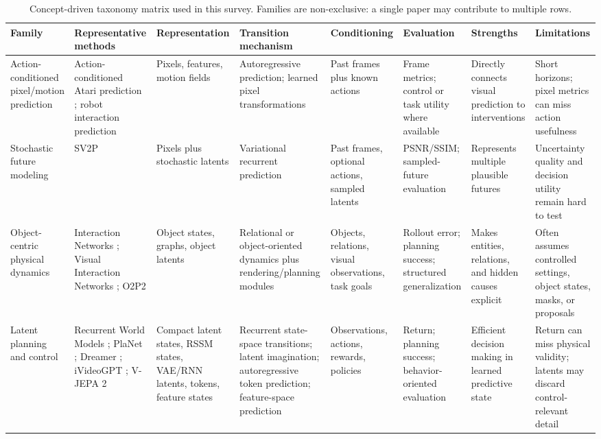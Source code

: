 \begin{table}[t]
\centering
\scriptsize
\setlength{\tabcolsep}{2pt}
\renewcommand{\arraystretch}{1.15}
\caption{Concept-driven taxonomy matrix used in this survey. Families are non-exclusive: a single paper may contribute to multiple rows.}
\label{tab:taxonomy_branches}
\begin{tabular}{p{} p{} p{} p{} p{} p{} p{} p{}}
\toprule
Family & Representative methods & Representation & Transition mechanism & Conditioning & Evaluation & Strengths & Limitations \\
\midrule
Action-conditioned pixel/motion prediction & Action-conditioned Atari prediction \cite{oh2015_action_conditional_video_prediction_prov}; robot interaction prediction \cite{finn2016_physical_interaction_video_prediction_prov} & Pixels, features, motion fields & Autoregressive prediction; learned pixel transformations & Past frames plus known actions & Frame metrics; control or task utility where available & Directly connects visual prediction to interventions & Short horizons; pixel metrics can miss action usefulness \\
Stochastic future modeling & SV2P \cite{babaeizadeh2018_sv2p_prov} & Pixels plus stochastic latents & Variational recurrent prediction & Past frames, optional actions, sampled latents & PSNR/SSIM; sampled-future evaluation & Represents multiple plausible futures & Uncertainty quality and decision utility remain hard to test \\
Object-centric physical dynamics & Interaction Networks \cite{battaglia2016_interaction_networks_prov}; Visual Interaction Networks \cite{watters2017_visual_interaction_networks_prov}; O2P2 \cite{janner2019_o2p2_prov} & Object states, graphs, object latents & Relational or object-oriented dynamics plus rendering/planning modules & Objects, relations, visual observations, task goals & Rollout error; planning success; structured generalization & Makes entities, relations, and hidden causes explicit & Often assumes controlled settings, object states, masks, or proposals \\
Latent planning and control & Recurrent World Models \cite{ha2018_world_models_prov}; PlaNet \cite{hafner2019_planet_prov}; Dreamer \cite{hafner2020_dreamer_prov}; iVideoGPT \cite{wu2024ivideogpt}; V-JEPA 2 \cite{assran2025vjepa2_prov} & Compact latent states, RSSM states, VAE/RNN latents, tokens, feature states & Recurrent state-space transitions; latent imagination; autoregressive token prediction; feature-space prediction & Observations, actions, rewards, policies & Return; planning success; behavior-oriented evaluation & Efficient decision making in learned predictive state & Return can miss physical validity; latents may discard control-relevant detail \\

\end{tabular}
\end{table}
